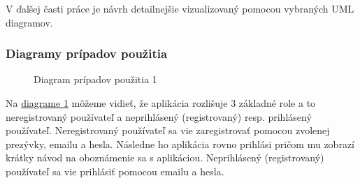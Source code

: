 V ďalšej časti práce je návrh detailnejšie vizualizovaný pomocou vybraných UML diagramov. 

\pagebreak

\subsubsection{Diagramy prípadov použitia}
\begin{figure}[hbt!]
  \centering  
  \def\stackalignment{c}
           {\scriptsize}
	\caption{Diagram prípadov použitia 1}  
  \label{usecase1}
\end{figure}

Na \hyperref[usecase1]{diagrame 1} môžeme vidieť, že aplikácia rozlišuje 3 základné role a to neregistrovaný používateľ a neprihlásený (registrovaný) resp. prihlásený používateľ. Neregistrovaný používateľ sa vie zaregistrovať pomocou zvolenej prezývky, emailu a hesla. Následne ho aplikácia rovno prihlási pričom mu zobrazí krátky návod na oboznámenie sa s aplikáciou. Neprihlásený (registrovaný) používateľ sa vie prihlásiť pomocou emailu a hesla.
\pagebreak


